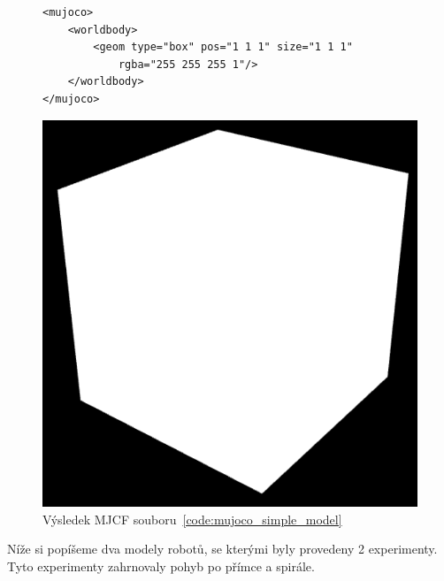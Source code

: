 

\begin{figure}[h]
    \begin{minipage}[c]{0.68\linewidth}
        \begin{lstlisting}
<mujoco>
    <worldbody>
        <geom type="box" pos="1 1 1" size="1 1 1"
            rgba="255 255 255 1"/>
    </worldbody>
</mujoco>
        \end{lstlisting}
    \end{minipage}
    \hfill
    \begin{minipage}[c]{0.30\linewidth}
        \includegraphics[width=\linewidth]{obrazky/mujoco_simple_model.png}
        \caption{
            Výsledek MJCF souboru~\ref{code:mujoco_simple_model}
        }
        \label{fig:mujoco_simple_model}
    \end{minipage}
\end{figure}






Níže si popíšeme dva modely robotů, se kterými byly provedeny 2 experimenty.
Tyto experimenty zahrnovaly pohyb po přímce a spirále.


